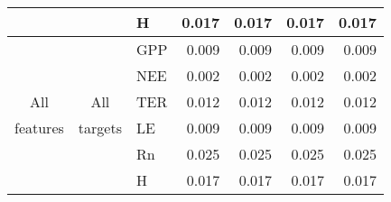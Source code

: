 \begin{table}[htbp]
\begin{center}
\begin{tabular}{|l|l|l|r|r|r|r|}
    \multicolumn{ 1}{|l|}{} & \multicolumn{ 1}{l|}{} &  H & 0.017 & 0.017 & 0.017 & 0.017 \\ \hline

    \multicolumn{ 1}{|c|}{} & \multicolumn{ 1}{c|}{} & GPP& 0.009 & 0.009 & 0.009 & 0.009 \\ \cline{ 3- 6}

    \multicolumn{ 1}{|c|}{} & \multicolumn{ 1}{l|}{} & NEE & 0.002 & 0.002 & 0.002 & 0.002 \\ \cline{ 3- 6}

    \multicolumn{ 1}{|c|}{All} & \multicolumn{ 1}{c|}{All} & TER & 0.012 & 0.012 & 0.012 & 0.012 \\ \cline{ 3- 6}

    \multicolumn{ 1}{|c|}{features} & \multicolumn{ 1}{c|}{targets} & LE & 0.009 & 0.009 & 0.009 & 0.009 \\ \cline{ 3- 6}

    \multicolumn{ 1}{|l|}{} & \multicolumn{ 1}{l|}{} & Rn & 0.025 & 0.025 & 0.025 & 0.025 \\ \cline{ 3- 6}

    \multicolumn{ 1}{|l|}{} & \multicolumn{ 1}{l|}{} & H & 0.017 & 0.017 & 0.017 & 0.017 \\ \hline

\end{tabular}

\end{center}

\label{results}

\end{table}


